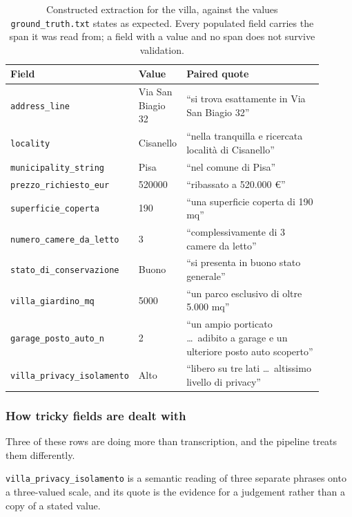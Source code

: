 \begin{table}[htbp]
\centering
\small
\begin{tabular}{p{0.30\linewidth}p{0.13\linewidth}p{0.47\linewidth}}
\hline
\textbf{Field} & \textbf{Value} & \textbf{Paired quote} \\
\hline
\footnotesize{\texttt{address\_line}} & Via San Biagio 32 & ``si trova esattamente in Via San Biagio 32'' \\
\footnotesize{\texttt{locality}} & Cisanello & ``nella tranquilla e ricercata località di Cisanello'' \\
\footnotesize{\texttt{municipality\_string}} & Pisa & ``nel comune di Pisa'' \\
\footnotesize{\texttt{prezzo\_richiesto\_eur}} & 520000 & ``ribassato a 520.000 €'' \\
\footnotesize{\texttt{superficie\_coperta}} & 190 & ``una superficie coperta di 190 mq'' \\
\footnotesize{\texttt{numero\_camere\_da\_letto}} & 3 & ``complessivamente di 3 camere da letto'' \\
\footnotesize{\texttt{stato\_di\_conservazione}} & Buono & ``si presenta in buono stato generale'' \\
\footnotesize{\texttt{villa\_giardino\_mq}} & 5000 & ``un parco esclusivo di oltre 5.000 mq'' \\
\footnotesize{\texttt{garage\_posto\_auto\_n}} & 2 & ``un ampio porticato \dots\ adibito a garage e un ulteriore posto auto scoperto'' \\
\footnotesize{\texttt{villa\_privacy\_isolamento}} & Alto & ``libero su tre lati \dots\ altissimo livello di privacy'' \\
\hline
\end{tabular}
\caption{Constructed extraction for the villa, against the values \texttt{ground\_truth.txt} states as expected. Every populated field carries the span it was read from; a field with a value and no span does not survive validation.}
\label{tab:villa-record}
\end{table}

\subsubsection{How tricky fields are dealt with}
Three of these rows are doing more than transcription, and the pipeline treats them differently. 

\texttt{villa\_privacy\_isolamento} is a semantic reading of three separate phrases onto a three-valued scale, and its quote is the evidence for a judgement rather than a copy of a stated value. 

